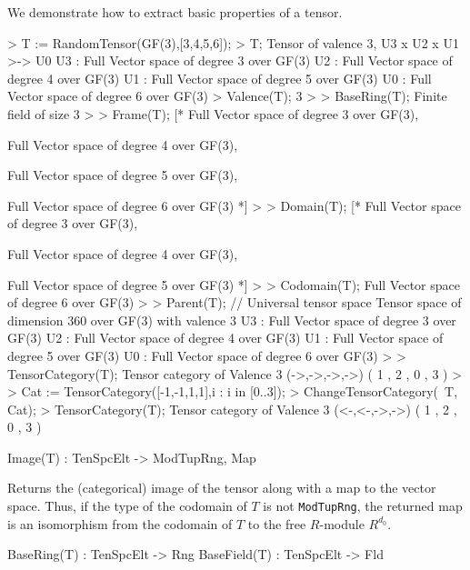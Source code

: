 \begin{example}
We demonstrate how to extract basic properties of a tensor.

\begin{code}
> T := RandomTensor(GF(3),[3,4,5,6]);
> T;
Tensor of valence 3, U3 x U2 x U1 >-> U0
U3 : Full Vector space of degree 3 over GF(3)
U2 : Full Vector space of degree 4 over GF(3)
U1 : Full Vector space of degree 5 over GF(3)
U0 : Full Vector space of degree 6 over GF(3)
> Valence(T);
3
> 
> BaseRing(T);
Finite field of size 3
> 
> Frame(T);
[*
    Full Vector space of degree 3 over GF(3),

    Full Vector space of degree 4 over GF(3),

    Full Vector space of degree 5 over GF(3),

    Full Vector space of degree 6 over GF(3)
*]
> 
> Domain(T);
[*
    Full Vector space of degree 3 over GF(3),

    Full Vector space of degree 4 over GF(3),

    Full Vector space of degree 5 over GF(3)
*]
> 
> Codomain(T);
Full Vector space of degree 6 over GF(3)
> 
> Parent(T); // Universal tensor space
Tensor space of dimension 360 over GF(3) with valence 3
U3 : Full Vector space of degree 3 over GF(3)
U2 : Full Vector space of degree 4 over GF(3)
U1 : Full Vector space of degree 5 over GF(3)
U0 : Full Vector space of degree 6 over GF(3)
> 
> TensorCategory(T);
Tensor category of Valence 3 (->,->,->,->) ({ 1 },{ 2 },{ 0 },{ 3 })
> 
> Cat := TensorCategory([-1,-1,1,1],{{i} : i in [0..3]});
> ChangeTensorCategory(~T, Cat);
> TensorCategory(T);
Tensor category of Valence 3 (<-,<-,->,->) ({ 1 },{ 2 },{ 0 },{ 3 })
\end{code}
\end{example}

\begin{intrinsics}
Image(T) : TenSpcElt -> ModTupRng, Map
\end{intrinsics}

Returns the (categorical) image of the tensor along with a map to the vector space.
Thus, if the type of the codomain of $T$ is not {\tt ModTupRng}, the returned map
is an isomorphism from the codomain of $T$ to the free $R$-module $R^{d_0}$. 

\begin{intrinsics}
BaseRing(T) : TenSpcElt -> Rng
BaseField(T) : TenSpcElt -> Fld
\end{intrinsics}


